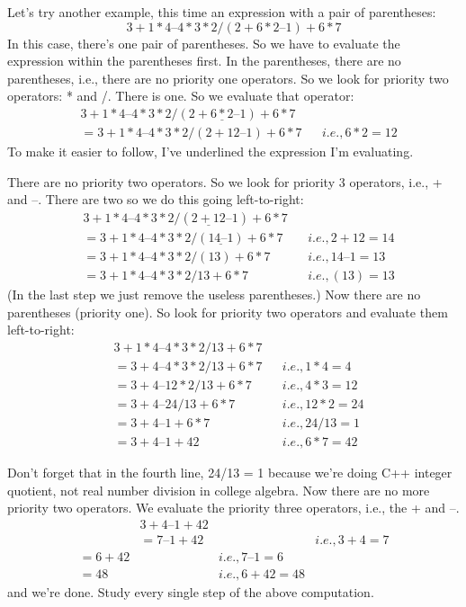 Let's try another example, this time an expression with a pair of
parentheses:
\[3 + 1 * 4 – 4 * 3 * 2 / (2 + 6 * 2 – 1) + 6 * 7\]
In this case, there's one pair of parentheses. So we have to evaluate the
expression within the parentheses first. In the parentheses, there are no
parentheses, i.e., there are no priority one operators. So we look for
priority two operators: * and /. There is one. So we evaluate that
operator:
\begin{align*}
  &3 + 1 * 4 – 4 * 3 * 2 / (2 + \underline{6 * 2} – 1) + 6 * 7\\
  &= 3 + 1 * 4 – 4 * 3 * 2 / (2 + 12 – 1) + 6 * 7 & &i.e., 6 * 2 = 12
\end{align*}
To make it easier to follow, I've underlined the expression I'm evaluating.

There are no priority two operators. So we look for priority 3 operators,
i.e., + and –. There are two so we do this going left-to-right:
\begin{align*}
&3 + 1 * 4 – 4 * 3 * 2 / (\underline{2 + 12} – 1) + 6 * 7\\
&= 3 + 1 * 4 – 4 * 3 * 2 / (\underline{14 – 1}) + 6 * 7 & &i.e., 2 + 12 = 14\\
&= 3 + 1 * 4 – 4 * 3 * 2 / (13) + 6 * 7 & &i.e., 14 – 1 = 13\\
&= 3 + 1 * 4 – 4 * 3 * 2 / 13 + 6 * 7 & &i.e., (13) = 13
\end{align*}
(In the last step we just remove the useless parentheses.) Now there are
no parentheses (priority one). So look for priority two operators and
evaluate them left-to-right:
\begin{align*}
&3 + 1 * 4 – 4 * 3 * 2 / 13 + 6 * 7\\
&= 3 + 4 – 4 * 3 * 2 / 13 + 6 * 7 & &i.e., 1 * 4 = 4\\
&= 3 + 4 – 12 * 2 / 13 + 6 * 7 & &i.e., 4 * 3 = 12\\
&= 3 + 4 – 24 / 13 + 6 * 7 & &i.e., 12 * 2 = 24\\
&=3+4–1+6*7 & &i.e., 24 / 13 = 1\\
&= 3 + 4 – 1 + 42 & &i.e., 6 * 7 = 42
\end{align*}

Don't forget that in the fourth line, 24/13 = 1 because we're doing C++
integer quotient, not real number division in college algebra.
Now there are no more priority two operators. We evaluate the priority
three operators, i.e., the + and –.
\begin{align*}
&3 + 4 – 1 + 42\\
&= 7 – 1 + 42 & &i.e., 3 + 4 = 7\\
= 6 + 42 & &i.e., 7 – 1 = 6\\
= 48 & &i.e., 6 + 42 = 48
\end{align*}
and we're done.
Study every single step of the above computation.

